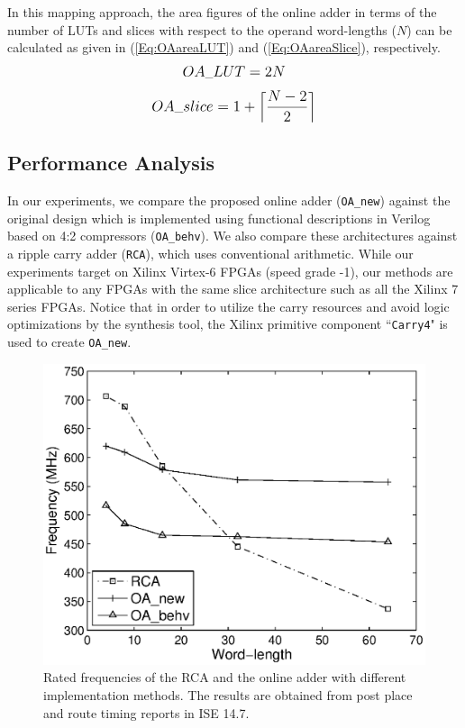 \documentclass[conference]{IEEEtran}
\begin{document}
In this mapping approach, the area figures of the online adder in terms of the number of LUTs and slices with respect to the operand word-lengths ($N$) can be calculated as given in (\ref{Eq:OAareaLUT}) and (\ref{Eq:OAareaSlice}), respectively.\vspace{-0.5ex}
%
\begin{eqnarray}\label{Eq:OAareaLUT}
\scriptsize
	OA\_LUT = 2N
\normalsize
\vspace{-0.5ex}
\end{eqnarray}
%
\begin{eqnarray}\label{Eq:OAareaSlice}
\footnotesize
	OA\_slice = 1+\left\lceil\frac{N-2}{2}\right\rceil
\normalsize
\end{eqnarray}

\subsection{Performance Analysis}\label{subsec:OA_Performance}\vspace{-0.5ex}
In our experiments, we compare the proposed online adder (\texttt{OA\_new}) against the original design which is implemented using functional descriptions in Verilog based on 4:2 compressors (\texttt{OA\_behv}).  We also compare these architectures against a ripple carry adder (\texttt{RCA}), which uses conventional arithmetic. While our experiments target on Xilinx Virtex-6 FPGAs (speed grade -1), our methods are applicable to any FPGAs with the same slice architecture such as all the Xilinx 7 series FPGAs. Notice that in order to utilize the carry resources and avoid logic optimizations by the synthesis tool, the Xilinx primitive component ``\texttt{Carry4}" is used to create \texttt{OA\_new}.\vspace{-0.5ex}

\begin{figure}[tbp]
	\centering
	\includegraphics[width=.45\textwidth]{./Figures/Exp/Adder_Freq.eps}
	\caption{Rated frequencies of the RCA and the online adder with different implementation methods. The results are obtained from post place and route timing reports in ISE 14.7.}
	\label{Fig:AdderFreq}
	\vspace{-1ex}
\end{figure}
\end{document}
